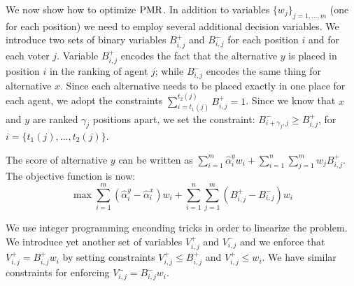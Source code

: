 We now show how to optimize $\operatorname{PMR}$.
In addition to variables $\{ w_{j} \}_{j=1,\ldots,m}$ (one for each position) we need to employ several additional decision variables.
We introduce two sets of binary variables $B^{+}_{i,j}$ and $B^{-}_{i,j}$  for each position $i$ and for each voter $j$.
Variable $B_{i,j}^{+}$ encodes the fact that the alternative $y$ is placed in position $i$ in the ranking of agent $j$; while  $B_{i,j}^{-}$ encodes the same thing for alternative $x$.
Since each alternative needs to be placed exactly in one place for each agent, we adopt the constraints
$\sum_{i=t_{1}(j)}^{t_{2}(j)} B_{i,j}^{+} = 1$.
Since we know that $x$ and $y$ are ranked $\gamma_{j}$ positions apart, we set the constraint:
$B_{i+\gamma_{j},j}^{-} \geq B_{i,j}^{+}$,  for $i = \{ t_{1}(j), \ldots, t_{2}(j)\}$.


The score of alternative $y$ can be written as $\sum_{i = 1}^{m} \hat{\alpha}_{i}^{y}  w_{i} + \sum_{i=1}^{n} \sum_{j=1}^{m} w_{j} B_{i,j}^{+}$.
The objective function is now:
 \[ \max \sum_{i = 1}^{m} (\hat{\alpha}_{i}^{y} - \hat{\alpha}_{i}^{x}) w_{i} +  \sum_{i=1}^{n} \sum_{j=1}^{m} (B_{i,j}^{+} - B_{i,j}^{-})  w_i \]

We use integer programming enconding tricks in order to linearize the problem.
We introduce yet another set of variables  $V_{i,j}^{+} $  and $V_{i,j}^{-}$ %
and we enforce that $V_{i,j}^{+} = B^{+}_{i,j} w_i$ by setting constraints $V_{i,j}^{+} \leq B^{+}_{i,j}$ and $V_{i,j}^{+}  \leq w_i$.
We have similar constraints for enforcing $V_{i,j}^{-} = B^{-}_{i,j} w_i$.

